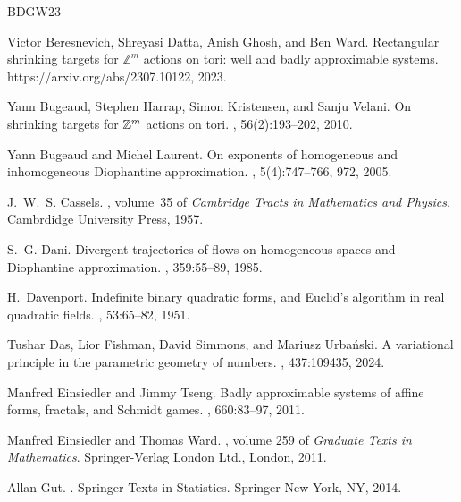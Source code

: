 \documentclass[reqno,11pt, twoside]{amsart}
\theoremstyle{plain}
\theoremstyle{definition}
\theoremstyle{definition}
\theoremstyle{remark}
\numberwithin{equation}{section}
\begin{document}
%
%
\def\cprime{$'$}
\begin{thebibliography}{BDGW23}

Victor Beresnevich, Shreyasi Datta, Anish Ghosh, and Ben Ward.
\newblock Rectangular shrinking targets for $\mathbb{Z}^m$ actions on tori:
  well and badly approximable systems.
\newblock https://arxiv.org/abs/2307.10122, 2023.

Yann Bugeaud, Stephen Harrap, Simon Kristensen, and Sanju Velani.
\newblock On shrinking targets for {$\Bbb Z^m$} actions on tori.
, 56(2):193--202, 2010.

Yann Bugeaud and Michel Laurent.
\newblock On exponents of homogeneous and inhomogeneous {D}iophantine
  approximation.
, 5(4):747--766, 972, 2005.

J.~W.~S. Cassels.
, volume~35 of {\em
  Cambridge Tracts in Mathematics and Physics}.
\newblock Cambrdidge University Press, 1957.

S.~G. Dani.
\newblock Divergent trajectories of flows on homogeneous spaces and
  {D}iophantine approximation.
, 359:55--89, 1985.

H.~Davenport.
\newblock Indefinite binary quadratic forms, and {E}uclid's algorithm in real
  quadratic fields.
, 53:65--82, 1951.

Tushar Das, Lior Fishman, David Simmons, and Mariusz Urbański.
\newblock A variational principle in the parametric geometry of numbers.
, 437:109435, 2024.

Manfred Einsiedler and Jimmy Tseng.
\newblock Badly approximable systems of affine forms, fractals, and {S}chmidt
  games.
, 660:83--97, 2011.

Manfred Einsiedler and Thomas Ward.
, volume 259 of
  {\em Graduate Texts in Mathematics}.
\newblock Springer-Verlag London Ltd., London, 2011.

Allan Gut.
.
\newblock Springer Texts in Statistics. Springer New York, NY, 2014.


\end{thebibliography}
\end{document}
